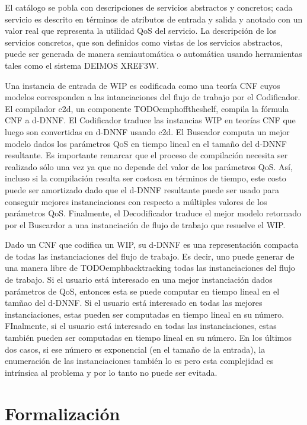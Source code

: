 \documentclass{article}
\begin{document}
El catálogo se pobla con descripciones de servicios abstractos y concretos; cada
servicio es descrito en términos de atributos de entrada y salida y anotado con
un valor real que representa la utilidad QoS del servicio. La descripción de los
servicios concretos, que son definidos como vistas de los servicios abstractos,
puede ser generada de manera semiautomática o automática usando herramientas
tales como el sistema DEIMOS XREF3W.

Una instancia de entrada de WIP es codificada como una teoría CNF cuyos modelos
corresponden a las intanciaciones del flujo de trabajo por el Codificador. El
compilador c2d, un componente TODOemphofftheshelf, compila la fórmula CNF a
d-DNNF. El Codificador traduce las instancias WIP en teorías CNF que luego son
convertidas en d-DNNF usando c2d. El Buscador computa un mejor modelo dados los
parámetros QoS en tiempo lineal en el tamaño del d-DNNF resultante. Es
importante remarcar que el proceso de compilación necesita ser realizado sólo
una vez ya que no depende del valor de los parámetros QoS. Así, incluso si la
compilación resulta ser costosa en términos de tiempo, este costo puede ser
amortizado dado que el d-DNNF resultante puede ser usado para conseguir mejores
instanciaciones con respecto a múltiples valores de los parámetros QoS.
Finalmente, el Decodificador traduce el mejor modelo retornado por el Buscardor
a una instanciación de flujo de trabajo que resuelve el WIP.

Dado un CNF que codifica un WIP, su d-DNNF es una representación compacta de
todas las instanciaciones del flujo de trabajo. Es decir, uno puede generar de
una manera libre de TODOemphbacktracking todas las instanciaciones del flujo de
trabajo. Si el usuario está interesado en una mejor instanciación dados
parámetros de QoS, entonces esta se puede computar en tiempo lineal en el tamñao
del d-DNNF. Si el usuario está interesado en todas las mejores instanciaciones,
estas pueden ser computadas en tiempo lineal en su número. FInalmente, si el
usuario está interesado en todas las instanciaciones, estas también pueden ser
computadas en tiempo lineal en su número. En los últimos dos casos, si ese
número es exponencial (en el tamaño de la entrada), la enumeración de las
instanciaciones también lo es pero esta complejidad es intrínsica al problema y
por lo tanto no puede ser evitada.

\section{Formalización}
\end{document}
